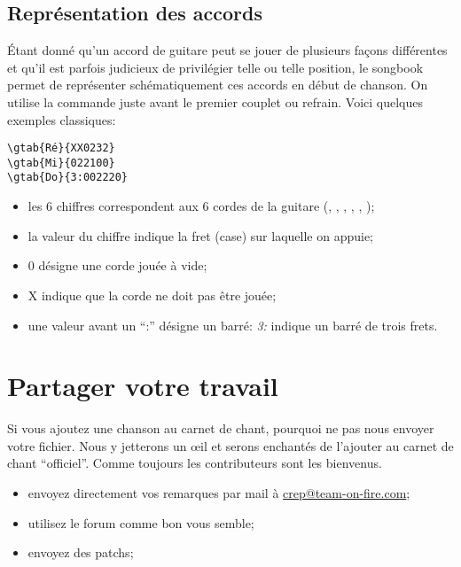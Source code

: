 \documentclass[versionenligne]{patacrep}
\begin{document}
\subsection{Représentation des accords}

Étant donné qu'un accord de guitare peut se jouer de plusieurs façons
différentes et qu'il est parfois judicieux de privilégier telle ou
telle position, le songbook permet de représenter schématiquement ces
accords en début de chanson. On utilise la commande  juste
avant le premier couplet ou refrain. Voici quelques exemples classiques:

\begin{verbatim}
\gtab{Ré}{XX0232}
\gtab{Mi}{022100}
\gtab{Do}{3:002220}
\end{verbatim}

\begin{itemize}
\item les 6 chiffres correspondent aux 6 cordes de la
  guitare (, , , , , );
\item la valeur du chiffre indique la fret (case) sur laquelle on
  appuie;
\item 0 désigne une corde jouée à vide;
\item X indique que la corde ne doit pas être jouée;
\item une valeur avant un ``:'' désigne un barré: \emph{3:} indique
  un barré de trois frets.
\end{itemize}


\section{Partager votre travail}

Si vous ajoutez une chanson au carnet de chant, pourquoi ne pas nous
envoyer votre fichier. Nous y jetterons un \oe{}il et serons enchantés
de l'ajouter au carnet de chant ``officiel''. Comme toujours les
contributeurs sont les bienvenus.

\begin{itemize}
\item envoyez directement vos remarques par mail à
  \url{crep@team-on-fire.com};
\item utilisez le forum comme bon vous semble;
\item envoyez des patchs;
\end{itemize}
\end{document}
